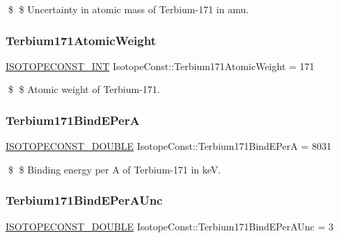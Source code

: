 \$ \$ Uncertainty in atomic mass of Terbium-\/171 in amu. \mbox{\label{group___isotope_const-_terbium-_tb171_ga6ca128d327b4c69a801b394de9fca0f5}} 
\subsubsection{\texorpdfstring{Terbium171\+Atomic\+Weight}{Terbium171AtomicWeight}}
{\footnotesize\ttfamily \mbox{\hyperlink{group___isotope_const-_macros_ga5f18360b3e99483a35c32d789e62621c}{I\+S\+O\+T\+O\+P\+E\+C\+O\+N\+S\+T\+\_\+\+I\+NT}} Isotope\+Const\+::\+Terbium171\+Atomic\+Weight = 171}

\$ \$ Atomic weight of Terbium-\/171. \mbox{\label{group___isotope_const-_terbium-_tb171_gadccebd628acb765f9267b03e3f60401d}} 
\subsubsection{\texorpdfstring{Terbium171\+Bind\+E\+PerA}{Terbium171BindEPerA}}
{\footnotesize\ttfamily \mbox{\hyperlink{group___isotope_const-_macros_ga8f45a7272ce02c0b4c65c44636ed719a}{I\+S\+O\+T\+O\+P\+E\+C\+O\+N\+S\+T\+\_\+\+D\+O\+U\+B\+LE}} Isotope\+Const\+::\+Terbium171\+Bind\+E\+PerA = 8031}

\$ \$ Binding energy per A of Terbium-\/171 in keV. \mbox{\label{group___isotope_const-_terbium-_tb171_ga30497df56b755824ada63d40904662d5}} 
\subsubsection{\texorpdfstring{Terbium171\+Bind\+E\+Per\+A\+Unc}{Terbium171BindEPerAUnc}}
{\footnotesize\ttfamily \mbox{\hyperlink{group___isotope_const-_macros_ga8f45a7272ce02c0b4c65c44636ed719a}{I\+S\+O\+T\+O\+P\+E\+C\+O\+N\+S\+T\+\_\+\+D\+O\+U\+B\+LE}} Isotope\+Const\+::\+Terbium171\+Bind\+E\+Per\+A\+Unc = 3}

